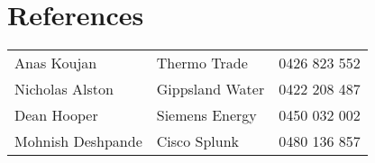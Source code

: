 \documentclass[11pt,a4paper]{article}
\begin{document}
\section{References}
\begin{flushleft}
    \begin{tabular}{@{}lll@{}}
        Anas Koujan & Thermo Trade & 0426 823 552 \\
        Nicholas Alston & Gippsland Water & 0422 208 487 \\
        Dean Hooper & Siemens Energy & 0450 032 002 \\
        Mohnish Deshpande & Cisco Splunk & 0480 136 857 \\
    \end{tabular}
\end{flushleft}
\end{document}
